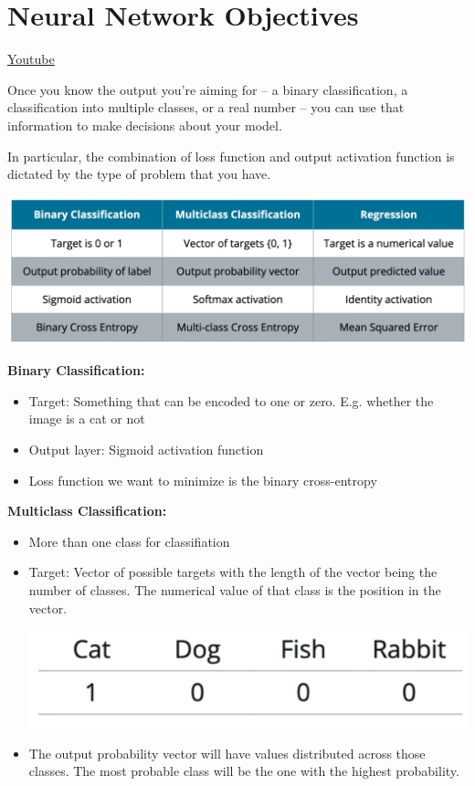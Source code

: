 \section{Neural Network Objectives}
\href{https://www.youtube.com/watch?v=Q0u_THaU9n8&t=19s&ab_channel=Udacity}{Youtube} \newline

Once you know the output you're aiming for -- a binary classification, a classification into multiple classes, or a real number -- you can use that information to make decisions about your model.\newline

In particular, the combination of loss function and output activation function is dictated by the type of problem that you have.

\includegraphics[width=1\linewidth]{img//intro//introNN/image2.png}

\textbf{Binary Classification:}
\begin{itemize}
    \item Target: Something that can be encoded to one or zero. E.g. whether the image is a cat or not
    \item Output layer: Sigmoid activation function
    \item Loss function we want to minimize is the binary cross-entropy
\end{itemize}

\textbf{Multiclass Classification:}
\begin{itemize}
    \item More than one class for classifiation
    \item  Target: Vector of possible targets with the length of the vector being the number of classes. The numerical value of  that class is the position in the vector. 

    \includegraphics[width=0.5\linewidth]{img//intro//introNN/image3.png}
    
    \item The output probability vector will have values distributed across those classes. The most probable class will be the one with the highest probability.
\end{itemize}

